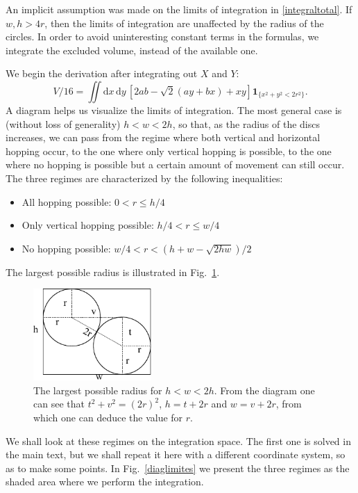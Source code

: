 \documentclass[superscriptaddress,pre,reprint,showpacs,onecolumn]{revtex4-1}
\newcommand{\rd}[1]{\mathrm{d}{#1} \,}
\newcommand{\indicatorsymbol}{\mathbf{1}}
\newcommand{\indicator}[1]{\indicatorsymbol_{ \{   #1 \} } }
\begin{document}
An implicit assumption was made on the limits of integration in \eqref{integraltotal}. If $w, h > 4r$, then the limits of integration
are unaffected by the radius of the circles.
In order to avoid uninteresting constant terms
in the formulas, we integrate
the excluded volume, instead of the available one. 

We begin the derivation after integrating out $X$ and $Y$:
\begin{equation}\label{VolumenGeneral}
V/16 =\iint \rd x \rd y \left[ 2ab-\sqrt{2}(ay+bx)+x y \right]
\indicator{x^2+y^2 < 2r^2 }.
\end{equation}
A diagram helps us visualize the limits of integration. The most general
case is (without loss of generality) $h < w < 2h$, so that, as the radius of the
discs increases, we can pass from the regime where both vertical and horizontal
hopping occur, to the one where only vertical hopping
is possible, to the one where no hopping is possible but a certain amount of movement
can still occur. The three regimes are characterized by the following inequalities:
\begin{itemize}
\item All hopping possible: $0<r \leq h/4$
\item Only vertical hopping possible: $h/4 < r \leq w/4$
\item No hopping possible: $w/4 < r < (h+w-\sqrt{2hw})/2$
\end{itemize}
The largest possible radius is illustrated in Fig.~\ref{radiomaximo}.

\begin{figure}[h]
  \centering
  \includegraphics[width=0.4\textwidth]{FigurasPerfectas/DiagramaRadioMaximo.pdf}
  \caption{The largest possible radius for $h<w<2h$. From the diagram
    one can see that $t^2+v^2=(2r)^2$, $h=t+2r$ and $w=v+2r$, from which
    one can deduce the value for $r$.}
  \label{radiomaximo}
\end{figure}

We shall look at these regimes on the integration space. The first one is solved
in the main text, but we shall repeat it here with a different coordinate system, so as to
make some points. In Fig.~\ref{diaglimites} we present the three regimes as
the shaded area where we perform the integration. 
  
\end{document}
